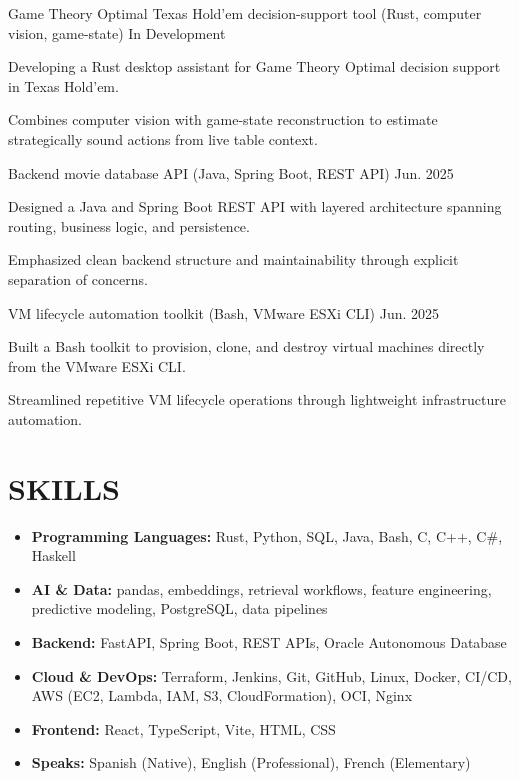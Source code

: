 \documentclass[10pt,a4paper]{article}
\begin{document}
    {Game Theory Optimal Texas Hold'em decision-support tool (Rust, computer vision, game-state)}
    {In Development}
    {
        \item Developing a Rust desktop assistant for Game Theory Optimal decision support in Texas Hold'em.
        \item Combines computer vision with game-state reconstruction to estimate strategically sound actions from live table context.
    }

    {Backend movie database API (Java, Spring Boot, REST API)}
    {Jun. 2025}
    {
        \item Designed a Java and Spring Boot REST API with layered architecture spanning routing, business logic, and persistence.
        \item Emphasized clean backend structure and maintainability through explicit separation of concerns.
    }

    {VM lifecycle automation toolkit (Bash, VMware ESXi CLI)}
    {Jun. 2025}
    {
        \item Built a Bash toolkit to provision, clone, and destroy virtual machines directly from the VMware ESXi CLI.
        \item Streamlined repetitive VM lifecycle operations through lightweight infrastructure automation.
    }

\section{SKILLS}
\begin{itemize}[label={-}]
    \item \textbf{Programming Languages:} Rust, Python, SQL, Java, Bash, C, C++, C\#, Haskell
    \item \textbf{AI \& Data:} pandas, embeddings, retrieval workflows, feature engineering, predictive modeling, PostgreSQL, data pipelines
    \item \textbf{Backend:} FastAPI, Spring Boot, REST APIs, Oracle Autonomous Database
    \item \textbf{Cloud \& DevOps:} Terraform, Jenkins, Git, GitHub, Linux, Docker, CI/CD, AWS (EC2, Lambda, IAM, S3, CloudFormation), OCI, Nginx
    \item \textbf{Frontend:} React, TypeScript, Vite, HTML, CSS
    \item \textbf{Speaks:} Spanish (Native), English (Professional), French (Elementary)
\end{itemize}
\end{document}
